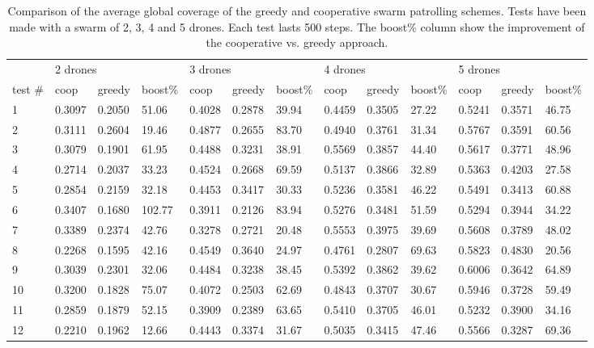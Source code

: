 \documentclass{article}
\begin{document}
\begin{table*}[tb]
	\centering
	\caption{Comparison of the average global coverage of the greedy and cooperative swarm patrolling schemes. Tests have been made with a swarm of 2, 3, 4 and 5 drones. Each test lasts 500 steps. The boost\% column show the improvement of the cooperative vs. greedy approach.}
		\footnotesize
		\label{tab:swarmcomparison}
		\begin{tabular}{l|lll|lll|lll|lll}
			\toprule
			 & \multicolumn{3}{l}{2 drones} & \multicolumn{3}{l}{3 drones} & \multicolumn{3}{l}{4 drones} & \multicolumn{3}{l}{5 drones} \\
			test \# & coop   & greedy & boost\% & coop  & greedy  & boost\% &  coop  & greedy  & boost\% & coop  & greedy  & boost\%  \\ \midrule
			1 & 0.3097 & 0.2050 & 51.06 & 0.4028 & 0.2878 & 39.94 & 0.4459 & 0.3505 & 27.22 & 0.5241 & 0.3571 & 46.75 \\
			2 &0.3111 & 0.2604 & 19.46 & 0.4877 & 0.2655 & 83.70 & 0.4940 & 0.3761 & 31.34 & 0.5767 & 0.3591 & 60.56 \\ 
			3 &0.3079 & 0.1901 & 61.95 & 0.4488 & 0.3231 & 38.91 & 0.5569 & 0.3857 & 44.40 & 0.5617 & 0.3771 & 48.96 \\
			4 &0.2714 & 0.2037 & 33.23 & 0.4524 & 0.2668 & 69.59 & 0.5137 & 0.3866 & 32.89 & 0.5363 & 0.4203 & 27.58 \\
			5 &0.2854 & 0.2159 & 32.18 & 0.4453 & 0.3417 & 30.33 & 0.5236 & 0.3581 & 46.22 & 0.5491 & 0.3413 & 60.88 \\
			6 &0.3407 & 0.1680 & 102.77 &0.3911 & 0.2126 & 83.94 & 0.5276 & 0.3481 & 51.59 & 0.5294 & 0.3944 & 34.22 \\
			7 &0.3389 & 0.2374 & 42.76 & 0.3278 & 0.2721 & 20.48 & 0.5553 & 0.3975 & 39.69 & 0.5608 & 0.3789 & 48.02 \\
			8 &0.2268 & 0.1595 & 42.16 & 0.4549 & 0.3640 & 24.97 & 0.4761 & 0.2807 & 69.63 & 0.5823 & 0.4830 & 20.56 \\
			9 &0.3039 & 0.2301 & 32.06 & 0.4484 & 0.3238 & 38.45  & 0.5392 & 0.3862 & 39.62 & 0.6006 & 0.3642 & 64.89 \\
			10 &0.3200 & 0.1828 & 75.07 &0.4072 & 0.2503 & 62.69 & 0.4843 & 0.3707 & 30.67 & 0.5946 & 0.3728 & 59.49 \\
			11 &0.2859 & 0.1879 & 52.15 & 0.3909 & 0.2389 & 63.65  & 0.5410 & 0.3705 & 46.01 & 0.5232 & 0.3900 & 34.16 \\
			12 &0.2210 & 0.1962 & 12.66 & 0.4443 & 0.3374 & 31.67 & 0.5035 & 0.3415 & 47.46 & 0.5566 & 0.3287 & 69.36 \\

\end{tabular}
\end{table*}
\end{document}
